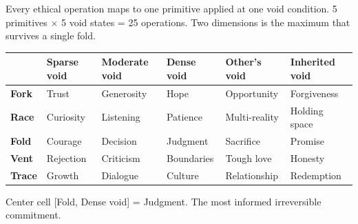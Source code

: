 \documentclass[
  11pt,
]{article}
\newcounter{none} %
\begin{document}
Every ethical operation maps to one primitive applied at one void
condition. 5 primitives \(\times\) 5 void states = 25 operations. Two
dimensions is the maximum that survives a single fold.

{\def\LTcaptype{none} %
\begin{longtable}[]{@{}
  >{\raggedright\arraybackslash}p{}
  >{\raggedright\arraybackslash}p{}
  >{\raggedright\arraybackslash}p{}
  >{\raggedright\arraybackslash}p{}
  >{\raggedright\arraybackslash}p{}
  >{\raggedright\arraybackslash}p{}@{}}
\toprule\noalign{}
\begin{minipage}[b]{\linewidth}\raggedright
\end{minipage} & \begin{minipage}[b]{\linewidth}\raggedright
Sparse void
\end{minipage} & \begin{minipage}[b]{\linewidth}\raggedright
Moderate void
\end{minipage} & \begin{minipage}[b]{\linewidth}\raggedright
Dense void
\end{minipage} & \begin{minipage}[b]{\linewidth}\raggedright
Other's void
\end{minipage} & \begin{minipage}[b]{\linewidth}\raggedright
Inherited void
\end{minipage} \\
\midrule\noalign{}
\endhead
\bottomrule\noalign{}
\endlastfoot
\textbf{Fork} & Trust & Generosity & Hope & Opportunity & Forgiveness \\
\textbf{Race} & Curiosity & Listening & Patience & Multi-reality &
Holding space \\
\textbf{Fold} & Courage & Decision & Judgment & Sacrifice & Promise \\
\textbf{Vent} & Rejection & Criticism & Boundaries & Tough love &
Honesty \\
\textbf{Trace} & Growth & Dialogue & Culture & Relationship &
Redemption \\
\end{longtable}
}

Center cell {[}Fold, Dense void{]} = Judgment. The most informed
irreversible commitment.
\end{document}
